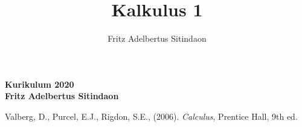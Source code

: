 \documentclass{article}
\title{Kalkulus 1}
\author{Fritz Adelbertus Sitindaon}
\date{}
\begin{document}
\begin{center}
    \textbf{}

    \vspace{0.5cm}
    \textbf{\Large Kurikulum 2020}\\
    \vspace{0.5cm}
    \textbf{\Large Fritz Adelbertus Sitindaon}

    \vspace{7cm}
\end{center}
\thispagestyle{empty}

\newpage
\tableofcontents


















\begin{thebibliography}{9}
Valberg, D., Purcel, E.J., Rigdon, S.E., (2006). \emph{Calculus}, Prentice Hall, 9th ed.
\end{thebibliography}
\end{document}

